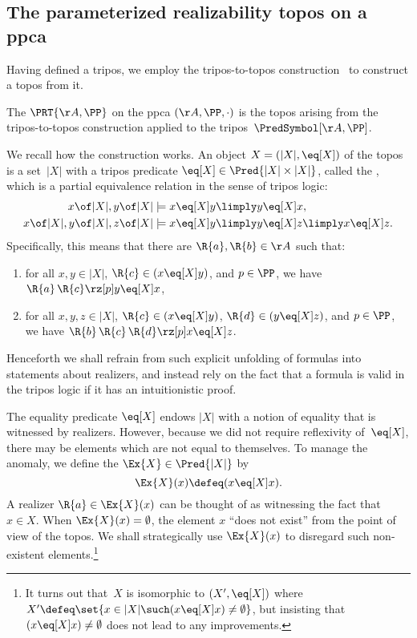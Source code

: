 \subsection{The parameterized realizability topos on a ppca}
\label{sec:unif-real-topos}

Having defined a tripos, we employ the tripos-to-topos construction~\cite[\S2.2]{oosten08:_realiz} to construct a topos from it.

\begin{definition}
  The  $\PRT{\AA, \PP}$ on the ppca $(\AA, \PP, {\cdot})$ is the topos arising from the tripos-to-topos construction applied to the tripos~$\PredSymbol[\AA, \PP]$.
\end{definition}

We recall how the construction works.
%
An object $X = (|X|, {\eq[X]})$ of the topos is a set~$|X|$ with a tripos predicate ${\eq[X]} \in \Pred{|X| \times |X|}$, called the , which is a partial equivalence relation in the sense of tripos logic:
%
\begin{align*}
  x \of |X|, y \of |X| &\models x \eq[X] y \limply y \eq[X] x,
  \\
  x \of |X|, y \of |X|, z \of |X| &\models x \eq[X] y \limply y \eq[X] z \limply x \eq[X] z.
\end{align*}
%
Specifically, this means that there are $\R{a}, \R{b} \in \AA$ such that:
%
\begin{enumerate}
\item for all $x, y \in |X|$, $\R{c} \in (x \eq[X] y)$, and $p \in \PP$, we have $\R{a} \, \R{c} \rz[p] y \eq[X] x$,
\item for all $x, y, z \in |X|$, $\R{c} \in (x \eq[X] y)$, $\R{d} \in (y \eq[X] z)$, and $p \in \PP$, we have $\R{b} \, \R{c} \, \R{d} \rz[p] x \eq[X] z$.
\end{enumerate}
%
Henceforth we shall refrain from such explicit unfolding of formulas into statements about realizers, and instead rely on the fact that a formula is valid in the tripos logic if it has an intuitionistic proof.

The equality predicate $\eq[X]$ endows $|X|$ with a notion of equality that is witnessed by realizers.
However, because we did not require reflexivity of~$\eq[X]$, there may be elements which are not equal to themselves.
To manage the anomaly, we define the  $\Ex{X} \in \Pred{|X|}$ by
%
\begin{equation*}
  \Ex{X}(x) \defeq (x \eq[X] x).
\end{equation*}
%
A realizer $\R{a} \in \Ex{X}(x)$ can be thought of as witnessing the fact that $x \in X$. When $\Ex{X}(x) = \emptyset$, the element $x$ ``does not exist'' from the point of view of the topos.
%
We shall strategically use $\Ex{X}(x)$ to disregard such non-existent elements.\footnote{%
It turns out that~$X$ is isomorphic to $(X', {\eq[X]})$ where $X' \defeq \set{x \in |X| \such (x \eq[X] x) \neq \emptyset}$, but insisting that $(x \eq[X] x) \neq \emptyset$ does not lead to any improvements.%
}

